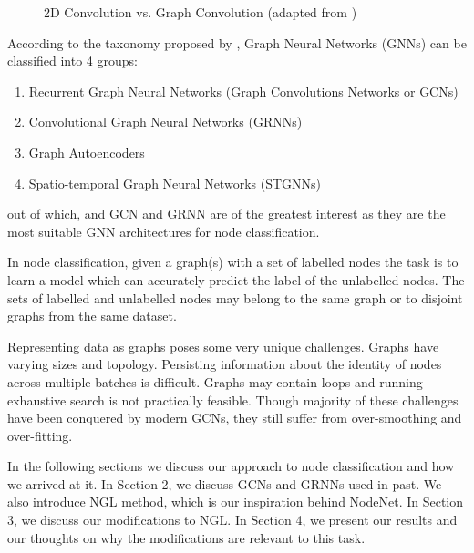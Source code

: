 \documentclass{article}
\begin{document}
\begin{figure}[h]
    \centering
    \hspace{0.05\linewidth}
    \caption{2D Convolution vs. Graph Convolution (adapted from \cite{9046288})}
    \label{fig:img_as_graph}
\end{figure}

According to the taxonomy proposed by \citet{9046288}, Graph Neural Networks (GNNs) can be classified into 4 groups:
\begin{enumerate}
    \item Recurrent Graph Neural Networks (Graph Convolutions Networks or GCNs)
    \item Convolutional Graph Neural Networks (GRNNs)
    \item Graph Autoencoders
    \item Spatio-temporal Graph Neural Networks (STGNNs)
\end{enumerate}
out of which, and GCN and GRNN are of the greatest interest as they are the most suitable GNN architectures for node classification.

In node classification, given a graph(s) with a set of labelled nodes the task is to learn a model which can accurately predict the label of the unlabelled nodes. The sets of labelled and unlabelled nodes may belong to the same graph or to disjoint graphs from the same dataset.

Representing data as graphs poses some very unique challenges. Graphs have varying sizes and topology. Persisting information about the identity of nodes across multiple batches is difficult. Graphs may contain loops and running exhaustive search is not practically feasible. Though majority of these challenges have been conquered by modern GCNs, they still suffer from over-smoothing and over-fitting.

In the following sections we discuss our approach to node classification and how we arrived at it. In Section 2, we discuss GCNs and GRNNs used in past. We also introduce NGL method, which is our inspiration behind NodeNet. In Section 3, we discuss our modifications to NGL. In Section 4, we present our results and our thoughts on why the modifications are relevant to this task.
\end{document}
